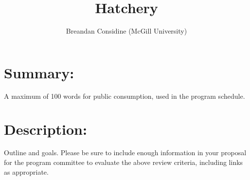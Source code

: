 \documentclass[12pt]{article}
\date{}
\begin{document}
\title{Hatchery}
\author{Breandan Considine (McGill University)}
\maketitle

\section*{Summary:}
A maximum of 100 words for public consumption, used in the program schedule.

\section*{Description:}
Outline and goals. Please be sure to include enough information in your proposal for the program committee to evaluate the above review criteria, including links as appropriate.
\end{document}
